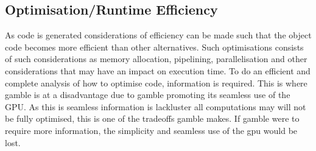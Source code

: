 \subsection*{Optimisation/Runtime Efficiency}
As code is generated considerations of efficiency can be made such that the object code becomes more efficient than other alternatives.
Such optimisations consists of such considerations as memory allocation, pipelining, parallelisation and other considerations that may have an impact on execution time.
To do an efficient and complete analysis of how to optimise code, information is required.
This is where \gls{gamble} is at a disadvantage due to \gls{gamble} promoting its seamless use of the GPU.
As this is seamless information is lackluster all computations may will not be fully optimised, this is one of the tradeoffs \gls{gamble} makes.
If \gls{gamble} were to require more information, the simplicity and seamless use of the \acrshort{gpu} would be lost.